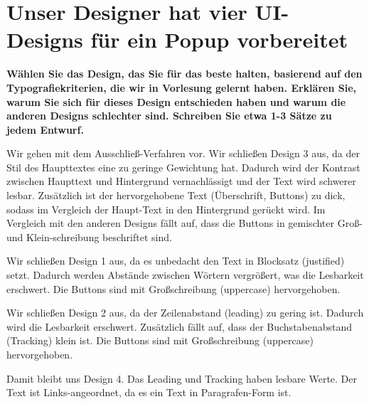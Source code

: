 \documentclass[a4paper,12pt]{article}
\begin{document}
\section{Unser Designer hat vier UI-Designs für ein Popup vorbereitet}

\textbf{Wählen Sie das Design,
  das Sie für das beste halten, basierend auf den Typografiekriterien, die wir in Vorlesung
  gelernt haben. Erklären Sie, warum Sie sich für dieses Design entschieden haben und
  warum die anderen Designs schlechter sind. Schreiben Sie etwa 1-3 Sätze zu jedem
  Entwurf.}

Wir gehen mit dem Ausschließ-Verfahren vor. Wir schließen Design 3 aus, da der Stil des Haupttextes
eine zu geringe Gewichtung hat. Dadurch wird der Kontrast zwischen Haupttext und Hintergrund
vernachlässigt und der Text wird schwerer lesbar. Zusätzlich ist der hervorgehobene Text (Überschrift, Buttons) zu dick,
sodass im Vergleich der Haupt-Text in den Hintergrund gerückt wird. Im Vergleich mit
den anderen Designs fällt auf, dass die Buttons in gemischter Groß- und Klein-schreibung
beschriftet sind.


Wir schließen Design 1 aus, da es unbedacht den Text in Blocksatz (justified) setzt.
Dadurch werden Abstände zwischen Wörtern vergrößert, was die Lesbarkeit erschwert.
Die Buttons sind mit Großschreibung (uppercase) hervorgehoben.

Wir schließen Design 2 aus, da der Zeilenabstand (leading) zu gering ist. Dadurch wird
die Lesbarkeit erschwert. Zusätzlich fällt auf, dass der Buchstabenabstand (Tracking) klein ist.
Die Buttons sind mit Großschreibung (uppercase) hervorgehoben.

Damit bleibt uns Design 4.
Das Leading und Tracking haben lesbare Werte.
Der Text ist Links-angeordnet, da es ein Text in Paragrafen-Form ist.
\end{document}
